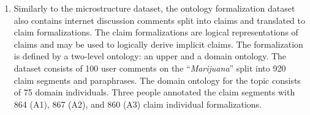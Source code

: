 \begin{enumerate}[label=\textbf{A.\arabic*}]
\item\label{item:structure_dataset} 
Similarly to the microstructure dataset, 
the ontology formalization dataset also contains internet discussion
comments split into claims and translated to claim formalizations.
The claim formalizations are logical representations of claims
and may be used to logically derive implicit claims.
The formalization is defined by a two-level ontology: an upper and 
a domain ontology. 
The dataset consists of 100 user comments on the ``\emph{Marijuana}''
split into 920 claim segments and paraphrases. 
The domain ontology for the topic consists of 75 domain
individuals. Three people annotated the claim segments with 
864 (A1), 867 (A2), and 860 (A3) claim individual formalizations.

\end{enumerate}
